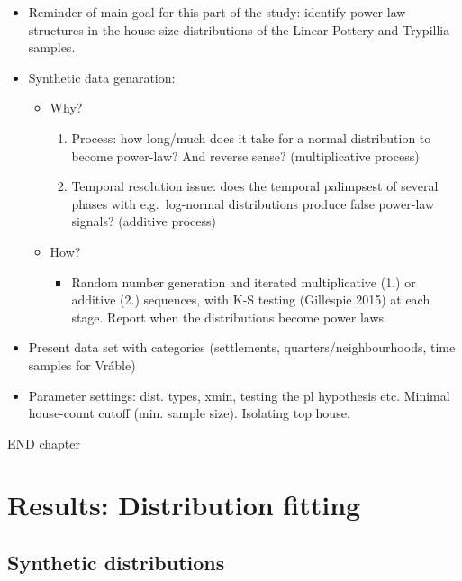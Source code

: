 \documentclass[
  12pt,
]{book}
\providecommand{\tightlist}{%
  \setlength{\itemsep}{0pt}\setlength{\parskip}{0pt}}
\begin{document}
\begin{itemize}
\item
  Reminder of main goal for this part of the study: identify power-law structures in the house-size distributions of the Linear Pottery and Trypillia samples.
\item
  Synthetic data genaration:

  \begin{itemize}
  \item
    Why?

    \begin{enumerate}
    \def\labelenumi{\arabic{enumi}.}
    \item
      Process: how long/much does it take for a normal distribution to become power-law? And reverse sense? (multiplicative process)
    \item
      Temporal resolution issue: does the temporal palimpsest of several phases with e.g.~log-normal distributions produce false power-law signals? (additive process)
    \end{enumerate}
  \item
    How?

    \begin{itemize}
    \tightlist
    \item
      Random number generation and iterated multiplicative (1.) or additive (2.) sequences, with K-S testing (Gillespie 2015) at each stage. Report when the distributions become power laws.
    \end{itemize}
  \end{itemize}
\item
  Present data set with categories (settlements, quarters/neighbourhoods, time samples for Vráble)
\item
  Parameter settings: dist. types, xmin, testing the pl hypothesis etc. Minimal house-count cutoff (min. sample size). Isolating top house.
\end{itemize}

END chapter

\hypertarget{results-distfit}{%
\chapter{Results: Distribution fitting}\label{results-distfit}}

\hypertarget{synthetic-distributions}{%
\section{Synthetic distributions}\label{synthetic-distributions}}
\end{document}
